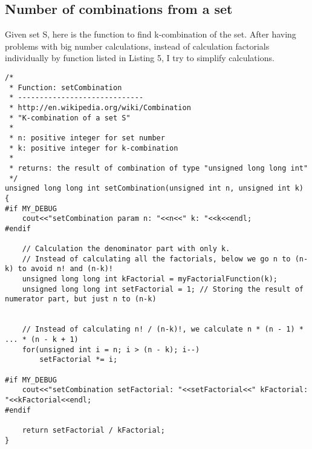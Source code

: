 \documentclass{article}
\begin{document}
	\subsection{Number of combinations from a set}
	Given set S, here is the function to find k-combination of the set. After having problems with big number calculations, instead of calculation factorials individually by function listed in Listing 5, I try to simplify calculations.
		\begin{lstlisting}[label=set-combination,caption=Set Combination]	
/*
 * Function: setCombination
 * -----------------------------
 * http://en.wikipedia.org/wiki/Combination
 * "K-combination of a set S"
 *
 * n: positive integer for set number
 * k: positive integer for k-combination
 *
 * returns: the result of combination of type "unsigned long long int"
 */
unsigned long long int setCombination(unsigned int n, unsigned int k)
{
#if MY_DEBUG
    cout<<"setCombination param n: "<<n<<" k: "<<k<<endl;
#endif
    
    // Calculation the denominator part with only k.
    // Instead of calculating all the factorials, below we go n to (n-k) to avoid n! and (n-k)!
    unsigned long long int kFactorial = myFactorialFunction(k);
    unsigned long long int setFactorial = 1; // Storing the result of numerator part, but just n to (n-k)
    
    
    // Instead of calculating n! / (n-k)!, we calculate n * (n - 1) * ... * (n - k + 1)
    for(unsigned int i = n; i > (n - k); i--)
        setFactorial *= i;
    
#if MY_DEBUG
    cout<<"setCombination setFactorial: "<<setFactorial<<" kFactorial: "<<kFactorial<<endl;
#endif
    
    return setFactorial / kFactorial;
}
		\end{lstlisting}
\end{document}
